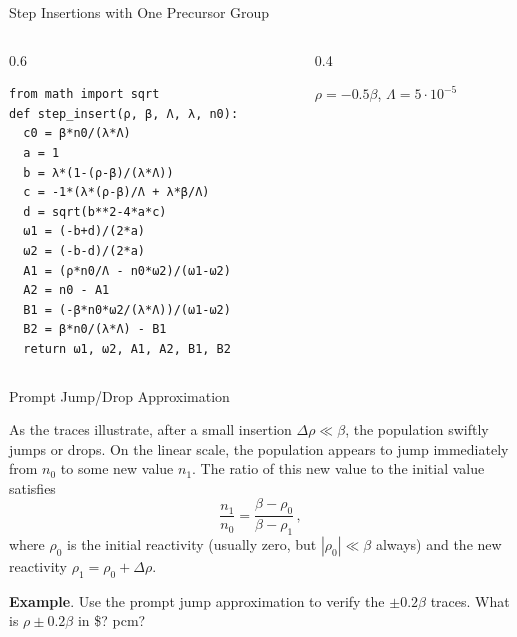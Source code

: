 \documentclass[aspectratio=1610]{beamer}
\begin{document}
\begin{frame}[fragile]{Step Insertions with One Precursor Group}
 

\begin{columns}[T]

\begin{column}{0.6\textwidth}

\begin{verbatim}
from math import sqrt
def step_insert(ρ, β, Λ, λ, n0):
  c0 = β*n0/(λ*Λ)
  a = 1
  b = λ*(1-(ρ-β)/(λ*Λ))
  c = -1*(λ*(ρ-β)/Λ + λ*β/Λ)
  d = sqrt(b**2-4*a*c)
  ω1 = (-b+d)/(2*a)
  ω2 = (-b-d)/(2*a)
  A1 = (ρ*n0/Λ - n0*ω2)/(ω1-ω2)
  A2 = n0 - A1
  B1 = (-β*n0*ω2/(λ*Λ))/(ω1-ω2)
  B2 = β*n0/(λ*Λ) - B1
  return ω1, ω2, A1, A2, B1, B2
\end{verbatim} 

\end{column}


\begin{column}{0.4\textwidth}

$\rho=-0.5\beta$, $\Lambda = 5\cdot 10^{-5}$

\resizebox{0.99\textwidth}{!}{}

\end{column}

\end{columns}

 
\end{frame}

\begin{frame}[fragile]{Prompt Jump/Drop Approximation}

As the traces illustrate, after a small insertion $\Delta \rho \ll \beta$, the population swiftly jumps or drops.  On the linear scale, the population appears to jump immediately from $n_0$ to some new value $n_1$.  The ratio of this new value to the initial value satisfies 
\begin{equation*}
\boxed{\frac{n_1}{n_0} = \frac{\beta - \rho_0}{\beta - \rho_1}} \, ,
  \tag{Prompt Jump Approximation}
\end{equation*}
where $\rho_0$ is the initial reactivity (usually zero, but $|\rho_0| \ll \beta$ always) and the new reactivity $\rho_1 = \rho_0 + \Delta \rho$.

\vfill 

{\bf Example}. Use the prompt jump approximation to verify
the $\pm 0.2\beta$ traces.  What is $\rho \pm 0.2\beta$ in \$? pcm?

\end{frame}
\end{document}
